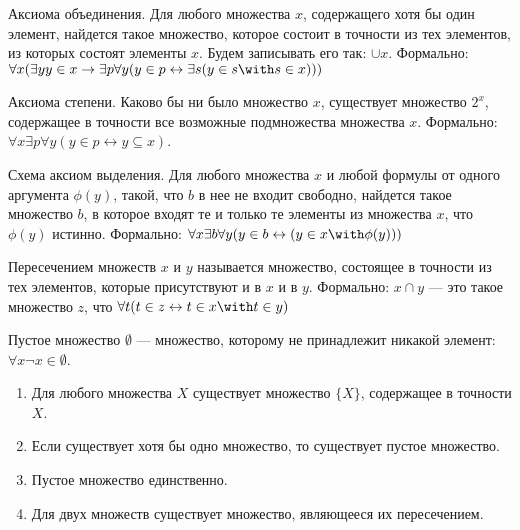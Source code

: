 \begin{axiom}{Аксиома объединения.}
Для любого множества $x$, содержащего хотя бы один элемент, найдется такое множество, которое состоит в точности
из тех элементов, из которых состоят элементы $x$. Будем записывать его так: $\cup x$.
Формально: $\forall x (\exists y y \in x \rightarrow \exists p \forall y (y \in p \leftrightarrow \exists s (y \in s \with s \in x)))$
\end{axiom}

\begin{axiom}{Аксиома степени.}
Каково бы ни было множество $x$, существует множество $2^x$, содержащее в точности
все возможные подмножества множества $x$.
Формально: $\forall x \exists p \forall y (y \in p \leftrightarrow y \subseteq x)$.
\end{axiom}

\begin{axiom}{Схема аксиом выделения.}
Для любого множества $x$ и любой формулы от одного аргумента $\phi(y)$, такой, что
$b$ в нее не входит свободно, найдется такое множество $b$, в которое
входят те и только те элементы из множества $x$, что $\phi(y)$ истинно.
Формально: $\forall x \exists b \forall y (y \in b \leftrightarrow (y \in x \with \phi(y)))$
\end{axiom}

\begin{definition}Пересечением множеств $x$ и $y$ называется множество, состоящее
в точности из тех элементов, которые присутствуют и в $x$ и в $y$. Формально:
$x \cap y$ --- это такое множество $z$, что $\forall t (t \in z \leftrightarrow t \in x \with t \in y)$
\end{definition}

\begin{definition}Пустое множество $\emptyset$ --- множество, которому не принадлежит
никакой элемент: $\forall x \neg x \in \emptyset$.
\end{definition}

\begin{theorem}\begin{enumerate}
\item Для любого множества $X$ существует множество $\{X\}$, содержащее в точности $X$.
\item Если существует хотя бы одно множество, то существует пустое множество.
\item Пустое множество единственно.
\item Для двух множеств существует множество, являющееся их пересечением.
\end{enumerate}\end{theorem}

